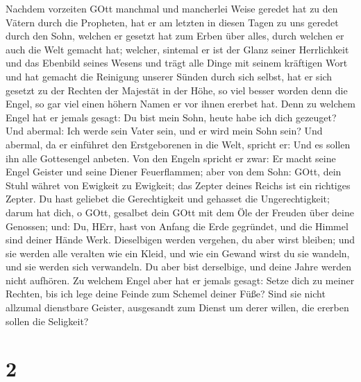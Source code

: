  Nachdem vorzeiten GOtt manchmal und mancherlei Weise
geredet hat zu den Vätern durch die Propheten,  hat er am
letzten in diesen Tagen zu uns geredet durch den Sohn, welchen er
gesetzt hat zum Erben über alles, durch welchen er auch die Welt gemacht
hat;  welcher, sintemal er ist der Glanz seiner Herrlichkeit
und das Ebenbild seines Wesens und trägt alle Dinge mit seinem kräftigen
Wort und hat gemacht die Reinigung unserer Sünden durch sich selbst, hat
er sich gesetzt zu der Rechten der Majestät in der Höhe,  so
viel besser worden denn die Engel, so gar viel einen höhern Namen er vor
ihnen ererbet hat.  Denn zu welchem Engel hat er jemals
gesagt: Du bist mein Sohn, heute habe ich dich gezeuget? Und abermal:
Ich werde sein Vater sein, und er wird mein Sohn sein?  Und
abermal, da er einführet den Erstgeborenen in die Welt, spricht er: Und
es sollen ihn alle Gottesengel anbeten.  Von den Engeln
spricht er zwar: Er macht seine Engel Geister und seine Diener
Feuerflammen;  aber von dem Sohn: GOtt, dein Stuhl währet
von Ewigkeit zu Ewigkeit; das Zepter deines Reichs ist ein richtiges
Zepter.  Du hast geliebet die Gerechtigkeit und gehasset die
Ungerechtigkeit; darum hat dich, o GOtt, gesalbet dein GOtt mit dem Öle
der Freuden über deine Genossen;  und: Du, HErr, hast von
Anfang die Erde gegründet, und die Himmel sind deiner Hände Werk.
 Dieselbigen werden vergehen, du aber wirst bleiben; und
sie werden alle veralten wie ein Kleid,  und wie ein Gewand
wirst du sie wandeln, und sie werden sich verwandeln. Du aber bist
derselbige, und deine Jahre werden nicht aufhören.  Zu
welchem Engel aber hat er jemals gesagt: Setze dich zu meiner Rechten,
bis ich lege deine Feinde zum Schemel deiner Füße?  Sind
sie nicht allzumal dienstbare Geister, ausgesandt zum Dienst um derer
willen, die ererben sollen die Seligkeit?

\hypertarget{section}{%
\section{2}\label{section}}

